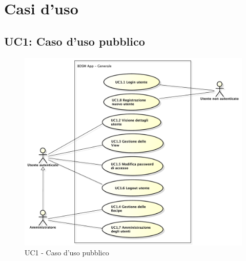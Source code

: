 
\section{Casi d'uso}

\subsection{UC1: Caso d'uso pubblico}

\begin{figure}[htbp]
	\centering
	\centerline{\includegraphics[scale=0.45]{./images/UC1.pdf}}
	\caption{UC1 - Caso d'uso pubblico}
\end{figure}

